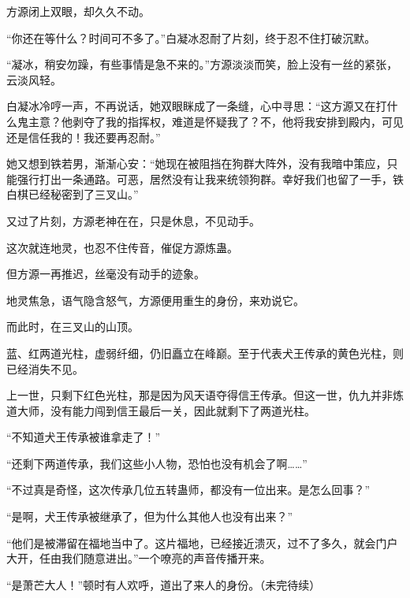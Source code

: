 \begin{this_body}
方源闭上双眼，却久久不动。

“你还在等什么？时间可不多了。”白凝冰忍耐了片刻，终于忍不住打破沉默。

“凝冰，稍安勿躁，有些事情是急不来的。”方源淡淡而笑，脸上没有一丝的紧张，云淡风轻。

白凝冰冷哼一声，不再说话，她双眼眯成了一条缝，心中寻思：“这方源又在打什么鬼主意？他剥夺了我的指挥权，难道是怀疑我了？不，他将我安排到殿内，可见还是信任我的！我还要再忍耐。”

她又想到铁若男，渐渐心安：“她现在被阻挡在狗群大阵外，没有我暗中策应，只能强行打出一条通路。可恶，居然没有让我来统领狗群。幸好我们也留了一手，铁白棋已经秘密到了三叉山。”

又过了片刻，方源老神在在，只是休息，不见动手。

这次就连地灵，也忍不住传音，催促方源炼蛊。

但方源一再推迟，丝毫没有动手的迹象。

地灵焦急，语气隐含怒气，方源便用重生的身份，来劝说它。

而此时，在三叉山的山顶。

蓝、红两道光柱，虚弱纤细，仍旧矗立在峰巅。至于代表犬王传承的黄色光柱，则已经消失不见。

上一世，只剩下红色光柱，那是因为风天语夺得信王传承。但这一世，仇九并非炼道大师，没有能力闯到信王最后一关，因此就剩下了两道光柱。

“不知道犬王传承被谁拿走了！”

“还剩下两道传承，我们这些小人物，恐怕也没有机会了啊……”

“不过真是奇怪，这次传承几位五转蛊师，都没有一位出来。是怎么回事？”

“是啊，犬王传承被继承了，但为什么其他人也没有出来？”

“他们是被滞留在福地当中了。这片福地，已经接近溃灭，过不了多久，就会门户大开，任由我们随意进出。”一个嘹亮的声音传播开来。

“是萧芒大人！”顿时有人欢呼，道出了来人的身份。（未完待续）

\end{this_body}

